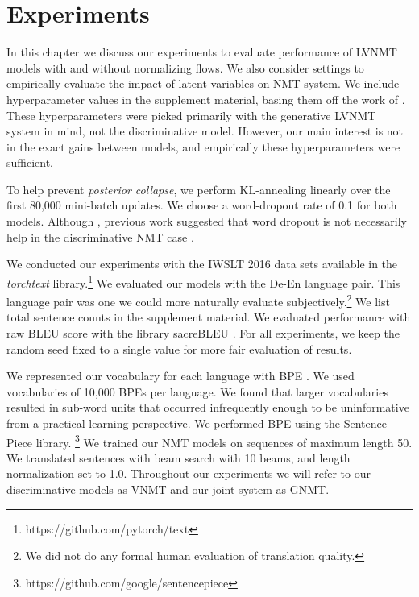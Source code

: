 \chapter{Experiments}

In this chapter we discuss our experiments to evaluate performance of \ac{LVNMT} models with and without normalizing flows. We also consider settings to empirically evaluate the impact of latent variables on \ac{NMT} system. We include hyperparameter values in the supplement material, basing them off the work of \citet{eikema2018AEVNMT}. These hyperparameters were picked primarily with the generative \ac{LVNMT} system in mind, not the discriminative model. However, our main interest is not in the exact gains between models, and empirically these hyperparameters were sufficient.

To help prevent \textit{posterior collapse}, we perform KL-annealing linearly over the first 80,000 mini-batch updates. We choose a word-dropout rate of 0.1 for both models. Although , previous work suggested that word dropout is not necessarily help in the discriminative \ac{NMT} case \cite{harshil2018GNMT}. %

We conducted our experiments with the IWSLT 2016 data sets available in the \textit{torchtext} library.\footnote{https://github.com/pytorch/text} We evaluated our models with the De-En language pair. This language pair was one we could more naturally evaluate subjectively.\footnote{ We did not do any formal human evaluation of translation quality.} We list total sentence counts in the supplement material. We evaluated performance with raw BLEU score with the library sacreBLEU \cite{post2018SacreBLEU}. For all experiments, we keep the random seed fixed to a single value for more fair evaluation of results. %

We represented our vocabulary for each language with \ac{BPE} \cite{sennrich2015NMTRarwordsBPE}. We used vocabularies of 10,000 \ac{BPE}s per language. We found that larger vocabularies resulted in sub-word units that occurred infrequently enough to be uninformative from a practical learning perspective. We performed \ac{BPE} using the Sentence Piece library. \footnote{https://github.com/google/sentencepiece} We trained our \ac{NMT} models on sequences of maximum length 50. We translated sentences with beam search with 10 beams, and length normalization set to 1.0. Throughout our experiments we will refer to our discriminative models as \ac{VNMT} and our joint system as \ac{GNMT}. %


